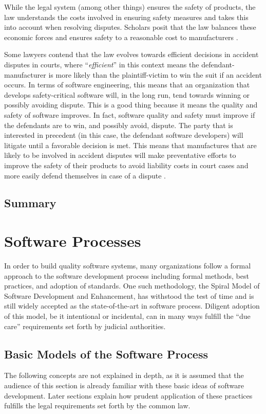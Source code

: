 \documentclass[12pt]{report}
\begin{document}
While the legal system (among other things) ensures the safety of products, the law understands the costs involved in ensuring safety measures and takes this into account when resolving disputes. Scholars posit that the law balances these economic forces and ensures safety to a reasonable cost to manufacturers \cite{FAKE}.

Some lawyers contend that the law evolves towards efficient decisions in accident disputes in courts, where ``\textit{efficient}'' in this context means the defendant-manufacturer is more likely than the plaintiff-victim to win the suit if an accident occurs. In terms of software engineering, this means that an organization that develops safety-critical software will, in the long run, tend towards winning or possibly avoiding dispute. This is a good thing because it means the quality and safety of software improves. In fact, software quality and safety must improve if the defendants are to win, and possibly avoid, dispute. The party that is interested in precedent (in this case, the defendant software developers) will litigate until a favorable decision is met. This means that manufactures that are likely to be involved in accident disputes will make preventative efforts to improve the safety of their products to avoid liability costs in court cases and more easily defend themselves in case of a dispute \cite{FAKE}.

\section{Summary}

\chapter{Software Processes} 
In order to build quality software systems, many organizations follow a formal approach to the software development process including formal methods, best practices, and adoption of standards. One such methodology, the Spiral Model of Software Development and Enhancement, has withstood the test of time and is still widely accepted as the state-of-the-art in software process. Diligent adoption of this model, be it intentional or incidental, can in many ways fulfill the ``due care'' requirements set forth by judicial authorities. 

\section{Basic Models of the Software Process} 
The following concepts are not explained in depth, as it is assumed that the audience of this section is already familiar with these basic ideas of software development. Later sections explain how prudent application of these practices fulfills the legal requirements set forth by the common law. 
\end{document}
